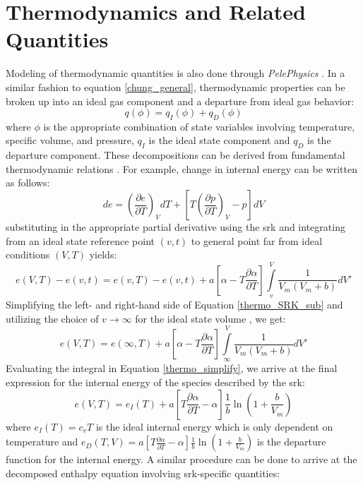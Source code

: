 \section{Thermodynamics and Related Quantities}
Modeling of thermodynamic quantities is also done through \textit{PelePhysics} \cite{PelePhysics}. In a similar fashion to equation \ref{chung_general}, thermodynamic properties can be broken up into an ideal gas component and a departure from ideal gas behavior:
\begin{equation} \label{thermo_general}
q(\phi) = q_{I}(\phi) + q_{D}(\phi)
\end{equation}
where $\phi$ is the appropriate combination of state variables involving temperature, specific volume, and pressure, $q_{I}$ is the ideal state component and $q_{D}$ is the departure component. These decompositions can be derived from fundamental thermodynamic relations \cite{}. For example, change in internal energy can be written as follows:
\begin{equation} \label{thermo_example}
de = \left( \dfrac{\partial e}{\partial T} \right)_{V} dT + \left[ T \left( \dfrac{\partial p}{\partial T} \right)_{V} - p  \right] dV
\end{equation}
substituting in the appropriate partial derivative using the \gls{srk} and integrating from an ideal state reference point $(v,t)$ to general point far from ideal conditions $(V,T)$ yields:
\begin{equation}  \label{thermo_SRK_sub}
e(V,T) - e(v,t) =  e(v,T) - e(v,t) + a \left[ \alpha - T \dfrac{\partial \alpha}{\partial T} \right] \int\limits_{v}^{V} \dfrac{1}{V_m(V_m + b)}dV'
\end{equation}
Simplifying the left- and right-hand side of Equation \ref{thermo_SRK_sub} and utilizing the choice of $v \to \infty$ for the ideal state volume \cite{}, we get:
\begin{equation} \label{thermo_simplify}
e(V,T) =  e(\infty,T) + a \left[ \alpha - T \dfrac{\partial \alpha}{\partial T} \right] \int\limits_{\infty}^{V} \dfrac{1}{V_m(V_m + b)}dV'
\end{equation}
Evaluating the integral in Equation \ref{thermo_simplify}, we arrive at the final expression for the internal energy of the species described by the \gls{srk}: 
\begin{equation} \label{thermo_final}
e(V,T) =  e_I(T) + a \left[ T \dfrac{\partial \alpha}{\partial T} - \alpha \right] \dfrac{1}{b}\ln\left( 1 + \dfrac{b}{V_m} \right)
\end{equation}
where $e_I(T)=c_vT$ is the ideal internal energy which is only dependent on temperature and $e_D(T,V) = a \left[ T \tfrac{\partial \alpha}{\partial T} - \alpha \right] \tfrac{1}{b}\ln\left( 1 + \tfrac{b}{V_m} \right)$ is the departure function for the internal energy. A similar procedure can be done to arrive at the decomposed enthalpy equation involving \gls{srk}-specific quantities:
